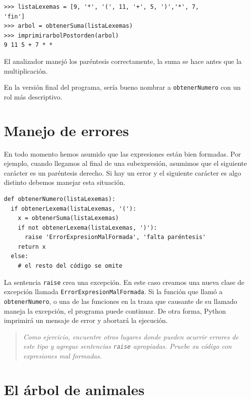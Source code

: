 \beforeverb
\begin{verbatim}
>>> listaLexemas = [9, '*', '(', 11, '+', 5, ')','*', 7, 
'fin']
>>> arbol = obtenerSuma(listaLexemas)
>>> imprimirarbolPostorden(arbol)
9 11 5 + 7 * *
\end{verbatim}
\afterverb
%

El analizador manejó los paréntesis correctamente, la suma se 
hace antes que la multiplicación.

En la versión final del programa, sería bueno nombrar a
 \texttt{obtenerNumero} con un rol más descriptivo.


\section{Manejo de errores}

En todo momento hemos asumido que las expresiones están bien
formadas. Por ejemplo, cuando llegamos al final de una 
subexpresión, asumimos que el siguiente carácter es un 
paréntesis derecho. Si hay un error y el siguiente carácter
es algo distinto debemos manejar esta situación.

\beforeverb
\begin{verbatim}
def obtenerNumero(listaLexemas):
  if obtenerLexema(listaLexemas, '('):
    x = obtenerSuma(listaLexemas)       
    if not obtenerLexema(listaLexemas, ')'):
      raise 'ErrorExpresionMalFormada', 'falta paréntesis'
    return x
  else:
    # el resto del código se omite
\end{verbatim}
\afterverb
%
La sentencia \texttt{raise} crea una excepción. En este caso
creamos una nueva clase de excepción llamada 
\texttt{ErrorExpresionMalFormada}.  Si la función que llamó a
\texttt{obtenerNumero}, o una de las funciones en la traza que
causante de su llamado maneja la excepción, el programa
puede continuar. De otra forma, Python imprimirá un mensaje de
error y abortará la ejecución.

\begin{quote}
{\em Como ejercicio, encuentre otros lugares donde pueden 
ocurrir errores de este tipo y agregue sentencias \texttt{raise} 
apropiadas. Pruebe su código con expresiones mal formadas.}
\end{quote}


\section{El árbol de animales}

